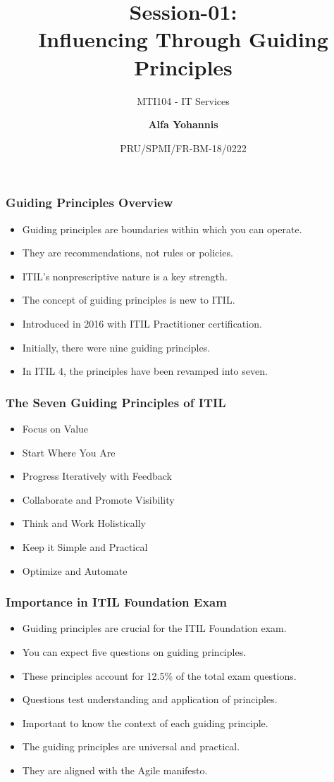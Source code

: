 \documentclass[aspectratio=169, table]{beamer}
\subtitle{MTI104 - IT Services}
\title{Session-01:\\\LARGE{Influencing Through Guiding \\Principles}}
\date[Serial]{\scriptsize {PRU/SPMI/FR-BM-18/0222}}
\author[Pradita]{\small{\textbf{Alfa Yohannis}}}
\begin{document}
\frame{\titlepage}

\begin{frame}
	\frametitle{Guiding Principles Overview}
	\begin{itemize}
		\item Guiding principles are boundaries within which you can operate.
		\item They are recommendations, not rules or policies.
		\item ITIL's nonprescriptive nature is a key strength.
		\item The concept of guiding principles is new to ITIL.
		\item Introduced in 2016 with ITIL Practitioner certification.
		\item Initially, there were nine guiding principles.
		\item In ITIL 4, the principles have been revamped into seven.
	\end{itemize}
\end{frame}

\begin{frame}
	\frametitle{The Seven Guiding Principles of ITIL}
	\begin{itemize}
		\item Focus on Value
		\item Start Where You Are
		\item Progress Iteratively with Feedback
		\item Collaborate and Promote Visibility
		\item Think and Work Holistically
		\item Keep it Simple and Practical
		\item Optimize and Automate
	\end{itemize}
\end{frame}

\begin{frame}
	\frametitle{Importance in ITIL Foundation Exam}
	\begin{itemize}
		\item Guiding principles are crucial for the ITIL Foundation exam.
		\item You can expect five questions on guiding principles.
		\item These principles account for 12.5\% of the total exam questions.
		\item Questions test understanding and application of principles.
		\item Important to know the context of each guiding principle.
		\item The guiding principles are universal and practical.
		\item They are aligned with the Agile manifesto.
	\end{itemize}
\end{frame}
\end{document}
